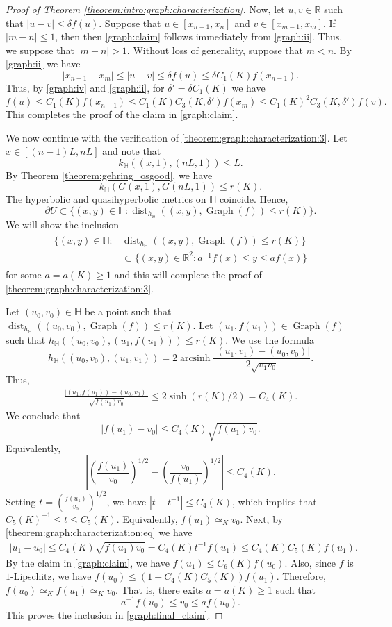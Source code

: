 \documentclass[letterpaper]{amsart}
\theoremstyle{plain}
\theoremstyle{definition}
\theoremstyle{remark}
\numberwithin{equation}{section}
\numberwithin{theorem}{section}
\newcommand{\R}{\mathbb R}
\newcommand{\UHP}{\mathbb H}
\DeclareMathOperator{\dist}{dist}
\DeclareMathOperator{\graph}{Graph}
\DeclareMathOperator{\arcsinh}{arcsinh}
\begin{document}
\begin{proof}[Proof of Theorem \ref{theorem:intro:graph:characterization}]
Now, let $u,v\in \R$ such that $|u-v|\leq \delta f(u)$. Suppose that $u\in [x_{n-1},x_n]$ and $v\in [x_{m-1},x_m]$. If $|m-n|\leq 1$, then then \eqref{graph:claim} follows immediately from \eqref{graph:ii}. Thus, we suppose that $|m-n|>1$. Without loss of generality, suppose that $m<n$. By \eqref{graph:ii} we have
$$|x_{n-1}-x_m|\leq |u-v|\leq \delta f(u)\leq \delta C_1(K) f(x_{n-1}).$$
Thus, by \eqref{graph:iv} and \eqref{graph:ii}, for $\delta'=\delta C_1(K)$ we have
$$f(u)\leq  C_1(K) f(x_{n-1})\leq C_1(K)C_3(K,\delta')f(x_m)\leq  C_1(K)^2C_3(K,\delta')f(v).$$
This completes the proof of the claim in \eqref{graph:claim}.

We now continue with the verification of \ref{theorem:graph:characterization:3}. Let $x\in [(n-1)L,nL]$ and note that  
$$k_\UHP((x,1),(nL,1))\leq L.$$
By Theorem \ref{theorem:gehring_osgood}, we have
$$k_\UHP(G(x,1), G(nL,1))\leq r(K).$$
The hyperbolic and quasihyperbolic metrics on $\UHP$ coincide. Hence,
$$\partial U\subset \{(x,y)\in \UHP: \dist_{h_\UHP}((x,y),\graph(f))\leq r(K)\}.$$
We will show the inclusion
\begin{align}\label{graph:final_claim}
\begin{aligned}
\{(x,y)\in \UHP: &\dist_{h_\UHP}((x,y),\graph(f))\leq r(K)\}\\&\subset \{(x,y)\in \R^2: a^{-1}f(x)\leq y\leq af(x)\}
\end{aligned}
\end{align}
for some $a=a(K)\geq 1$ and this will complete the proof of \ref{theorem:graph:characterization:3}.

Let $(u_0,v_0)\in \UHP$ be a point such that $\dist_{h_\UHP}((u_0,v_0),\graph(f))\leq r(K)$. Let $(u_1,f(u_1))\in \graph(f)$ such that $h_\UHP((u_0,v_0),(u_1,f(u_1)))\leq r(K)$. We use the formula
$$h_{\UHP}((u_0,v_0),(u_1,v_1))=2\arcsinh\frac{|(u_1,v_1)-(u_0,v_0)|}{2\sqrt{v_1v_0}}.$$ 
Thus, 
\begin{align}\label{theorem:graph:characterization:eq}
\frac{|(u_1,f(u_1))-(u_0,v_0)|}{\sqrt{f(u_1)v_0}} \leq 2\sinh(r(K)/2)=C_4(K).
\end{align}
We conclude that 
$$|f(u_1)-v_0| \leq C_4(K)\sqrt{f(u_1)v_0}.$$
Equivalently, 
$$\left|\left(\frac{f(u_1)}{v_0}\right)^{1/2}-\left(\frac{v_0}{f(u_1)}\right)^{1/2}\right|\leq C_4(K).$$
Setting $t= \left(\frac{f(u_1)}{v_0}\right)^{1/2}$, we have $|t-t^{-1}|\leq C_4(K)$, which implies that $C_5(K)^{-1}\leq t\leq C_5(K)$. Equivalently, $f(u_1)\simeq_K v_0$. Next, by  \eqref{theorem:graph:characterization:eq} we have
\begin{align*}
|u_1-u_0| \leq C_4(K) \sqrt{f(u_1)v_0} =C_4(K) t^{-1}f(u_1)\leq C_4(K)C_5(K) f(u_1).
\end{align*}
By the claim in \eqref{graph:claim}, we have $f(u_1)\leq C_6(K) f(u_0)$. Also, since $f$ is $1$-Lipschitz, we have $f(u_0)\leq (1+C_4(K)C_5(K))f(u_1)$. Therefore, $f(u_0)\simeq_K f(u_1)\simeq_K v_0$. That is, there exits $a=a(K)\geq 1$ such that
$$ a^{-1}f(u_0)\leq v_0\leq af(u_0).$$
This proves the inclusion in \eqref{graph:final_claim}.
\end{proof}
\end{document}

